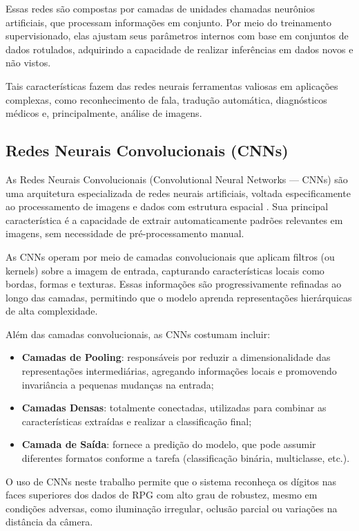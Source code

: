 Essas redes são compostas por camadas de unidades chamadas neurônios
artificiais, que processam informações em conjunto. Por meio do
treinamento supervisionado, elas ajustam seus parâmetros internos
com base em conjuntos de dados rotulados, adquirindo a capacidade
de realizar inferências em dados novos e não vistos.

Tais características fazem das redes neurais ferramentas valiosas
em aplicações complexas, como reconhecimento de fala, tradução
automática, diagnósticos médicos e, principalmente, análise de imagens.

\subsection{Redes Neurais Convolucionais (CNNs)}

As Redes Neurais Convolucionais (Convolutional Neural Networks —
CNNs) são uma arquitetura especializada de redes neurais artificiais,
voltada especificamente ao processamento de imagens e dados com
estrutura espacial \cite{lecun1998gradient}. Sua principal
característica é a capacidade de extrair automaticamente padrões
relevantes em imagens, sem necessidade de pré-processamento manual.

As CNNs operam por meio de camadas convolucionais que aplicam
filtros (ou kernels) sobre a imagem de entrada, capturando
características locais como bordas, formas e texturas. Essas
informações são progressivamente refinadas ao longo das camadas,
permitindo que o modelo aprenda representações hierárquicas de
alta complexidade.

Além das camadas convolucionais, as CNNs costumam incluir:
\begin{itemize}
\item \textbf{Camadas de Pooling}: responsáveis por reduzir a
dimensionalidade das representações intermediárias,
agregando informações locais e promovendo invariância a
pequenas mudanças na entrada;
\item \textbf{Camadas Densas}: totalmente conectadas, utilizadas
para combinar as características extraídas e realizar a
classificação final;
\item \textbf{Camada de Saída}: fornece a predição do modelo, que
pode assumir diferentes formatos conforme a tarefa
(classificação binária, multiclasse, etc.).
\end{itemize}

O uso de CNNs neste trabalho permite que o sistema reconheça os
dígitos nas faces superiores dos dados de RPG com alto grau de
robustez, mesmo em condições adversas, como iluminação irregular,
oclusão parcial ou variações na distância da câmera.

